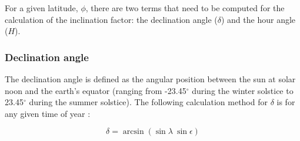 For a given latitude, $\phi$, there are two terms that need to be computed for the calculation of the inclination factor: the declination angle ($\delta$) and the hour angle ($H$).

\subsubsection{Declination angle}
\label{sec:delta}
The declination angle is defined as the angular position between the sun at solar noon and the earth's equator (ranging from -23.45$^{\circ}$ during the winter solstice to 23.45$^{\circ}$ during the summer solstice). 
The following calculation method for $\delta$ is for any given time of year \parencite{woolf68, loutre03}:

\begin{equation}
\label{eq:delta}
    \delta = \arcsin\left(\sin\lambda\:\sin\epsilon\right)
\end{equation}

